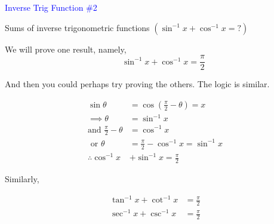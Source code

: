 \documentclass[14pt,fleqn]{extarticle}
\begin{document}
 

\begin{skill}
\textcolor{blue}{Inverse Trig Function \#2}

Sums of inverse trigonometric functions 
$\left(\sin^{-1}x + \cos^{-1} x = ? \right)  $ 
\end{skill}

\newcard 

We will prove one result, namely, 
\[ \qquad \sin^{-1} x + \cos^{-1} x = \frac\pi{2} \]

And then you could perhaps try proving the others. The logic is similar. 


\begin{align}
\sin\theta &= \cos\left( \frac\pi{2} - \theta \right) = x \\
\implies \theta &= \sin^{-1} x \\
\text{and } \frac\pi{2} - \theta &= \cos^{-1} x \\
\text{ or } \theta &= \frac\pi{2} - \cos^{-1}x = \sin^{-1} x \\
\therefore \cos^{-1}x &+ \sin^{-1}x = \frac\pi{2}  
\end{align}

Similarly, 

%
\begin{align}
\tan^{-1}x + \cot^{-1}x &= \frac\pi{2} \\ 
\sec^{-1} x + \csc^{-1} x &= \frac\pi{2} 
\end{align}
\end{document}
